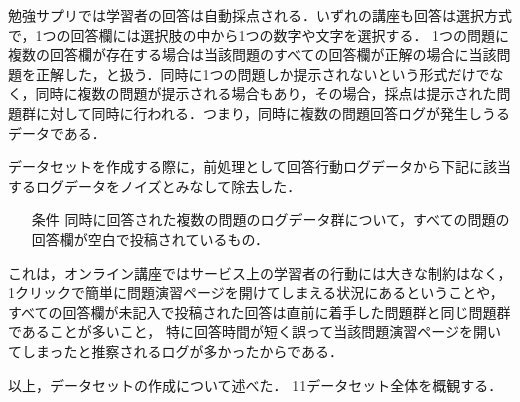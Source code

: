 勉強サプリでは学習者の回答は自動採点される．いずれの講座も回答は選択方式で，1つの回答欄には選択肢の中から1つの数字や文字を選択する．
1つの問題に複数の回答欄が存在する場合は当該問題のすべての回答欄が正解の場合に当該問題を正解した，と扱う．同時に1つの問題しか提示されないという形式だけでなく，同時に複数の問題が提示される場合もあり，その場合，採点は提示された問題群に対して同時に行われる．つまり，同時に複数の問題回答ログが発生しうるデータである．

データセットを作成する際に，前処理として回答行動ログデータから下記に該当するログデータをノイズとみなして除去した．
\begin{itemize}
	\item[条件] 同時に回答された複数の問題のログデータ群について，すべての問題の回答欄が空白で投稿されているもの．
\end{itemize}
これは，オンライン講座ではサービス上の学習者の行動には大きな制約はなく，
1クリックで簡単に問題演習ページを開けてしまえる状況にあるということや，
すべての回答欄が未記入で投稿された回答は直前に着手した問題群と同じ問題群であることが多いこと，
特に回答時間が短く誤って当該問題演習ページを開いてしまったと推察されるログが多かったからである．

以上，データセットの作成について述べた．
11データセット全体を概観する．

